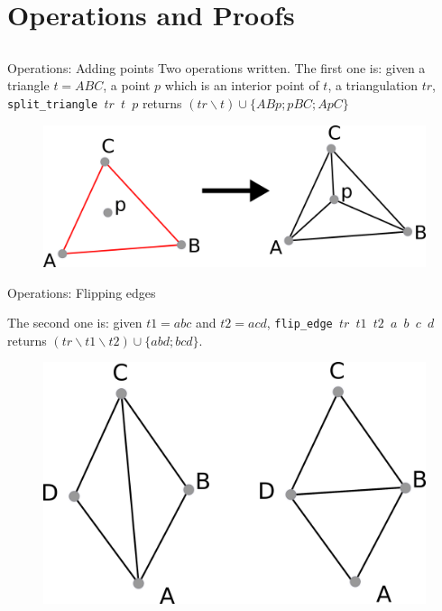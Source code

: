 \documentclass[18pt]{beamer}
\begin{document}
\section{Operations and Proofs}
\subsection*{}
\begin{frame}{Operations: Adding points}
Two operations written. The first one is: given a triangle $t = ABC$, a point $p$ which is an interior point of $t$, a triangulation $tr$, {\tt split\_triangle $tr$ $t$ $p$} returns $(tr \smallsetminus t) \cup \{ABp;pBC;ApC\}$

\begin{figure} 
  \centering
  \includegraphics[scale=1.2]{split_triangle}
\end{figure}
  \end{frame}
  
  
  \begin{frame}{Operations: Flipping edges}
  
   The second one is: given $t1 = abc$ and $t2=acd$, {\tt flip\_edge $tr$ $t1$ $t2$ $a$ $b$ $c$ $d$} returns $(tr \smallsetminus t1 \smallsetminus t2) \cup \{abd;bcd\}$.
   

 \begin{figure}
  \centering
  \includegraphics[scale=0.8]{flip_edge}

\end{figure}

\end{frame}
\end{document}
